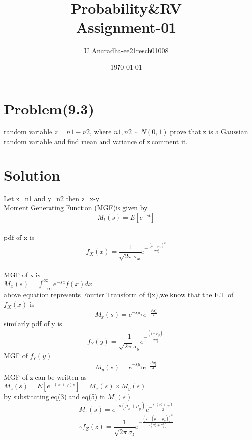 \documentclass[journal,12pt,twocolumn]{IEEEtran}
\title{Probability\&RV \\ Assignment-01}
\author{U Anuradha-ee21resch01008}
\date{\today}
\begin{document}
\maketitle

\section{Problem(9.3)}
random variable $z=n1-n2$, where $n1,n2\sim N(0,1)$
prove that z is a Gaussian random variable and find mean and variance of z.comment it.
\section{Solution}
Let x=n1 and  y=n2 then  z=x-y \\
Moment Generating Function (MGF)is given by 
\begin{equation}
   M_t(s)=E[e^{-st}] 
\end{equation}\\
pdf of x is 
\begin{equation}
    f_X(x)=\frac{1}{\sqrt{2\pi}\sigma_x}e^{-\frac{(x-\mu_x)^2}{2\sigma_x^2}}
\end{equation} \\
MGF of x is \\
$M_x(s)=\int_{-\infty}^{\infty}e^{-sx}f(x) dx $ \\
above equation represents Fourier Transform of f(x),we know that the F.T of $f_X(x)$ is
\begin{equation}
      M_x(s)=e^{-s\mu_x}e^{-\frac{s^2\sigma_x^2}{2}}
\end{equation}
similarly pdf of y is
\begin{equation}
    f_Y(y)=\frac{1}{\sqrt{2\pi}\sigma_y}e^{-\frac{(y-\mu_y)^2}{2\sigma_y^2}}
\end{equation}
MGF of $f_Y(y)$
\begin{equation}
    M_y(s)=e^{-s\mu_y}e^{-\frac{s^2\sigma_y^2}{2}}
\end{equation}
MGF of z can be written as \\
$M_z(s)=E[e^{-(x+y)s}]=M_x(s)\times M_y(s)$\\
by substituting eq(3) and eq(5) in $M_z(s)$\\
\begin{equation}
    M_z(s)=e^{-s(\mu_x+\mu_y)}e^{-\frac{s^2(\sigma_x^2+\sigma_y^2)}{2}}
\end{equation} 
\begin{equation}
   \therefore f_Z(z)=\frac{1}{\sqrt{2\pi}\sigma_z}e^{-\frac{(z-(\mu_x+\mu_y))^2}{2(\sigma_x^2+\sigma_y^2)}}
\end{equation}
\end{document}
